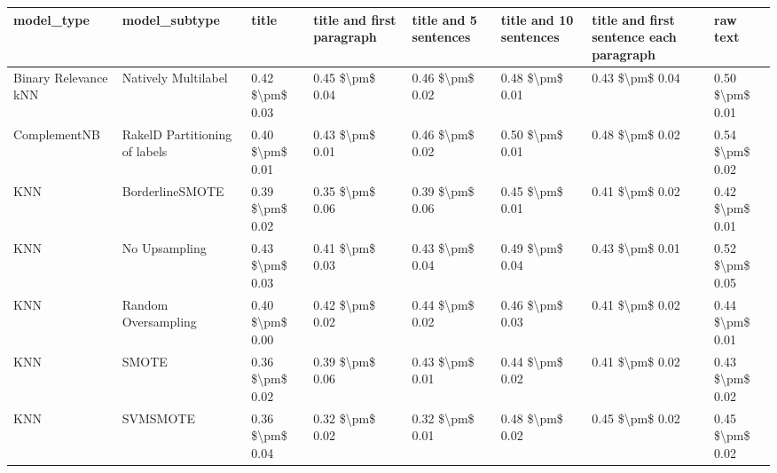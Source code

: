 \begin{tabular}{llllllll}
\toprule
                     model\_type &                 model\_subtype &           title & title and first paragraph & title and 5 sentences & title and 10 sentences & title and first sentence each paragraph &            raw text \\
\midrule
           Binary Relevance kNN &           Natively Multilabel & 0.42 \$\textbackslash pm\$ 0.03 &           0.45 \$\textbackslash pm\$ 0.04 &       0.46 \$\textbackslash pm\$ 0.02 &        0.48 \$\textbackslash pm\$ 0.01 &                         0.43 \$\textbackslash pm\$ 0.04 &     0.50 \$\textbackslash pm\$ 0.01 \\
                   ComplementNB & RakelD Partitioning of labels & 0.40 \$\textbackslash pm\$ 0.01 &           0.43 \$\textbackslash pm\$ 0.01 &       0.46 \$\textbackslash pm\$ 0.02 &        0.50 \$\textbackslash pm\$ 0.01 &                         0.48 \$\textbackslash pm\$ 0.02 &     0.54 \$\textbackslash pm\$ 0.02 \\
                            KNN &               BorderlineSMOTE & 0.39 \$\textbackslash pm\$ 0.02 &           0.35 \$\textbackslash pm\$ 0.06 &       0.39 \$\textbackslash pm\$ 0.06 &        0.45 \$\textbackslash pm\$ 0.01 &                         0.41 \$\textbackslash pm\$ 0.02 &     0.42 \$\textbackslash pm\$ 0.01 \\
                            KNN &                 No Upsampling & 0.43 \$\textbackslash pm\$ 0.03 &           0.41 \$\textbackslash pm\$ 0.03 &       0.43 \$\textbackslash pm\$ 0.04 &        0.49 \$\textbackslash pm\$ 0.04 &                         0.43 \$\textbackslash pm\$ 0.01 &     0.52 \$\textbackslash pm\$ 0.05 \\
                            KNN &           Random Oversampling & 0.40 \$\textbackslash pm\$ 0.00 &           0.42 \$\textbackslash pm\$ 0.02 &       0.44 \$\textbackslash pm\$ 0.02 &        0.46 \$\textbackslash pm\$ 0.03 &                         0.41 \$\textbackslash pm\$ 0.02 &     0.44 \$\textbackslash pm\$ 0.01 \\
                            KNN &                         SMOTE & 0.36 \$\textbackslash pm\$ 0.02 &           0.39 \$\textbackslash pm\$ 0.06 &       0.43 \$\textbackslash pm\$ 0.01 &        0.44 \$\textbackslash pm\$ 0.02 &                         0.41 \$\textbackslash pm\$ 0.02 &     0.43 \$\textbackslash pm\$ 0.02 \\
                            KNN &                      SVMSMOTE & 0.36 \$\textbackslash pm\$ 0.04 &           0.32 \$\textbackslash pm\$ 0.02 &       0.32 \$\textbackslash pm\$ 0.01 &        0.48 \$\textbackslash pm\$ 0.02 &                         0.45 \$\textbackslash pm\$ 0.02 &     0.45 \$\textbackslash pm\$ 0.02 \\

\end{tabular}
